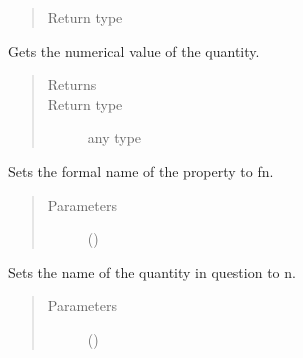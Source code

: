 \documentclass[letterpaper,10pt,openany,oneside,english]{sphinxmanual}
\begin{document}
\begin{fulllineitems}
\begin{fulllineitems}
\begin{quote}
\begin{description}
\item[{Return type}] \leavevmode
{}

\end{description}\end{quote}

\end{fulllineitems}


\begin{fulllineitems}
\label{\detokenize{support_rst/quantity:quantity.Quantity.GetValue}}
Gets the numerical value of the quantity.
\begin{quote}\begin{description}
\item[{Returns}] \leavevmode
{}

\item[{Return type}] \leavevmode
any type

\end{description}\end{quote}

\end{fulllineitems}


\begin{fulllineitems}
\label{\detokenize{support_rst/quantity:quantity.Quantity.SetFormalName}}
Sets the formal name of the property to fn.
\begin{quote}\begin{description}
\item[{Parameters}] \leavevmode
{} () \textendash{} 

\end{description}\end{quote}

\end{fulllineitems}


\begin{fulllineitems}
\label{\detokenize{support_rst/quantity:quantity.Quantity.SetName}}
Sets the name of the quantity in question to n.
\begin{quote}\begin{description}
\item[{Parameters}] \leavevmode
{} () \textendash{} 


\end{description}
\end{quote}
\end{fulllineitems}
\end{fulllineitems}
\end{document}
